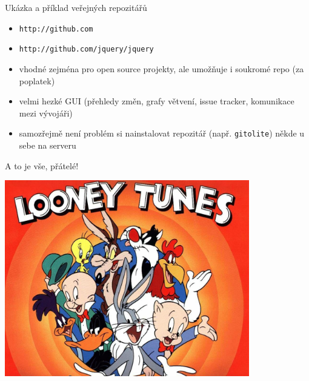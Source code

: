 \documentclass{beamer}
\begin{document}
\begin{frame}{Ukázka a příklad veřejných repozitářů}
  \begin{itemize}
    \item \texttt{http://github.com}
    \item \texttt{http://github.com/jquery/jquery}
    \item vhodné zejména pro open source projekty, ale umožňuje i soukromé repo (za poplatek)
    \item velmi hezké GUI (přehledy změn, grafy větvení, issue tracker, komunikace mezi vývojáři)
    \item samozřejmě není problém si nainstalovat repozitář (např. \texttt{gitolite}) někde u sebe na serveru
  \end{itemize}
\end{frame}



\begin{frame}{A to je vše, přátelé!}
  \begin{center}
    \includegraphics[width=0.8\textwidth]{looney_tunes}
  \end{center}
\end{frame}
\end{document}
